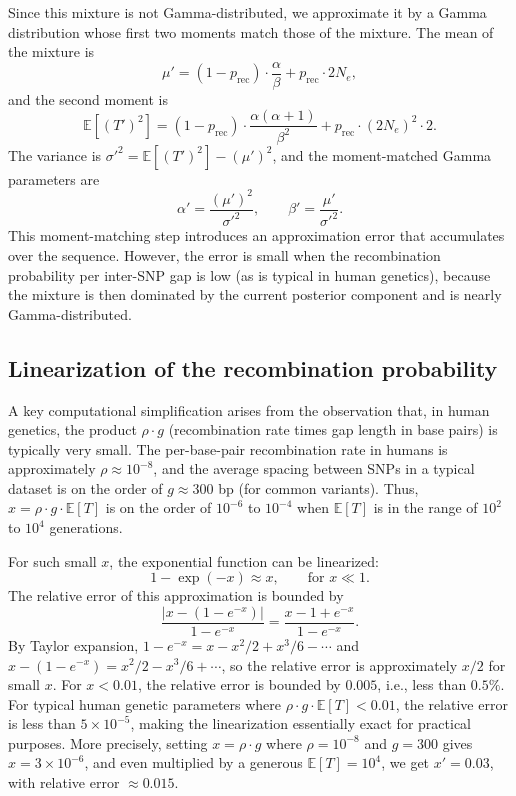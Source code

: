 \documentclass[10pt,letterpaper]{article}
\begin{document}
Since this mixture is not Gamma-distributed, we approximate it by a Gamma distribution whose first two moments match those of the mixture. The mean of the mixture is
\begin{equation}
\mu' = (1 - p_{\mathrm{rec}}) \cdot \frac{\alpha}{\beta} + p_{\mathrm{rec}} \cdot 2N_e,
\end{equation}
and the second moment is
\begin{equation}
\mathbb{E}[(T')^2] = (1 - p_{\mathrm{rec}}) \cdot \frac{\alpha(\alpha+1)}{\beta^2} + p_{\mathrm{rec}} \cdot (2N_e)^2 \cdot 2.
\end{equation}
The variance is $\sigma'^2 = \mathbb{E}[(T')^2] - (\mu')^2$, and the moment-matched Gamma parameters are
\begin{equation}
\alpha' = \frac{(\mu')^2}{\sigma'^2}, \qquad \beta' = \frac{\mu'}{\sigma'^2}.
\end{equation}
This moment-matching step introduces an approximation error that accumulates over the sequence. However, the error is small when the recombination probability per inter-SNP gap is low (as is typical in human genetics), because the mixture is then dominated by the current posterior component and is nearly Gamma-distributed.

\subsection{Linearization of the recombination probability}

A key computational simplification arises from the observation that, in human genetics, the product $\rho \cdot g$ (recombination rate times gap length in base pairs) is typically very small. The per-base-pair recombination rate in humans is approximately $\rho \approx 10^{-8}$, and the average spacing between SNPs in a typical dataset is on the order of $g \approx 300$ bp (for common variants). Thus, $x = \rho \cdot g \cdot \mathbb{E}[T]$ is on the order of $10^{-6}$ to $10^{-4}$ when $\mathbb{E}[T]$ is in the range of $10^2$ to $10^4$ generations.

For such small $x$, the exponential function can be linearized:
\begin{equation}
1 - \exp(-x) \approx x, \qquad \text{for } x \ll 1.
\label{eq:linearization}
\end{equation}
The relative error of this approximation is bounded by
\begin{equation}
\frac{|x - (1 - e^{-x})|}{1 - e^{-x}} = \frac{x - 1 + e^{-x}}{1 - e^{-x}}.
\end{equation}
By Taylor expansion, $1 - e^{-x} = x - x^2/2 + x^3/6 - \cdots$ and $x - (1 - e^{-x}) = x^2/2 - x^3/6 + \cdots$, so the relative error is approximately $x/2$ for small $x$. For $x < 0.01$, the relative error is bounded by $0.005$, i.e., less than $0.5\%$. For typical human genetic parameters where $\rho \cdot g \cdot \mathbb{E}[T] < 0.01$, the relative error is less than $5 \times 10^{-5}$, making the linearization essentially exact for practical purposes. More precisely, setting $x = \rho \cdot g$ where $\rho = 10^{-8}$ and $g = 300$ gives $x = 3 \times 10^{-6}$, and even multiplied by a generous $\mathbb{E}[T] = 10^4$, we get $x' = 0.03$, with relative error $\approx 0.015$.
\end{document}
